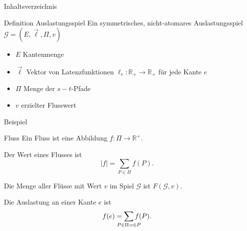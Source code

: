 \documentclass{beamer}
\begin{document}
\begin{frame}{Inhaltsverzeichnis}
	\tableofcontents
\end{frame}

\begin{frame}{Definition Auslastungsspiel}
	Ein symmetrisches, nicht-atomares \alert{Auslastungsspiel} $\mathcal G = (E, \vec{\ell}, \Pi, v)$
	\begin{itemize}
		\item $E$ Kantenmenge
		\item $\vec{\ell}$ Vektor von Latenzfunktionen $\ell_e : \mathbb R_+ \to \mathbb R_+$ für jede Kante $e$
		\item $\Pi$ Menge der $s-t$-Pfade
		\item $v$ erzielter Flusswert
	\end{itemize}
\end{frame}

\begin{frame}{Beispiel}
	\begin{figure}
	\end{figure}
\end{frame}

\begin{frame}{Fluss}
	Ein \alert{Fluss} ist eine Abbildung $f: \Pi \to \mathbb R^+$. 
	
	Der \alert{Wert} eines Flusses ist \[ |{f}| = \sum_{P \in \Pi} f(P) . \]
	
	Die Menge aller Flüsse mit Wert $v$ im Spiel $\mathcal G$ ist $F(\mathcal G, v)$.
	
	Die Auslastung an einer Kante $e$ ist \[ f(e) = \sum_{\mathclap{P \in \Pi: e \in P}} f(P) . \]
\end{frame}
\end{document}
